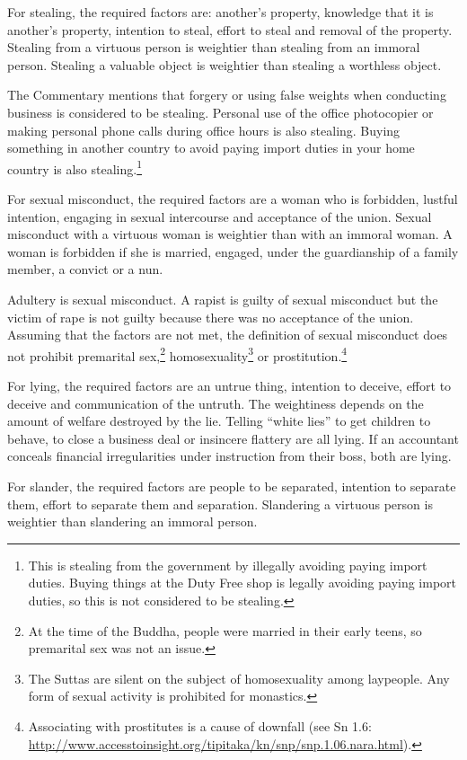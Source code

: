 For stealing, the required factors are: another’s property, knowledge that it is another’s property, intention to steal, effort to steal and removal of the property. Stealing from a virtuous person is weightier than stealing from an immoral person. Stealing a valuable object is weightier than stealing a worthless object.

The Commentary mentions that forgery or using false weights when conducting business is considered to be stealing. Personal use of the office photocopier or making personal phone calls during office hours is also stealing. Buying something in another country to avoid paying import duties in your home country is also stealing.\footnote{This is stealing from the government by illegally avoiding paying import duties. Buying things at the Duty Free shop is legally avoiding paying import duties, so this is not considered to be stealing.}

For sexual misconduct, the required factors are a woman who is forbidden, lustful intention, engaging in sexual intercourse and acceptance of the union. Sexual misconduct with a virtuous woman is weightier than with an immoral woman. A woman is forbidden if she is married, engaged, under the guardianship of a family member, a convict or a nun.

Adultery is sexual misconduct. A rapist is guilty of sexual misconduct but the victim of rape is not guilty because there was no acceptance of the union. Assuming that the factors are not met, the definition of sexual misconduct does not prohibit premarital sex,\footnote{At the time of the Buddha, people were married in their early teens, so premarital sex was not an issue.} homosexuality\footnote{The Suttas are silent on the subject of homosexuality among laypeople. Any form of sexual activity is prohibited for monastics.} or prostitution.\footnote{Associating with prostitutes is a cause of downfall (see Sn 1.6: \url{http://www.accesstoinsight.org/tipitaka/kn/snp/snp.1.06.nara.html}).}

For lying, the required factors are an untrue thing, intention to deceive, effort to deceive and communication of the untruth. The weightiness depends on the amount of welfare destroyed by the lie. Telling “white lies” to get children to behave, to close a business deal or insincere flattery are all lying. If an accountant conceals financial irregularities under instruction from their boss, both are lying.

\pagebreak

For slander, the required factors are people to be separated, intention to separate them, effort to separate them and separation. Slandering a virtuous person is weightier than slandering an immoral person.

